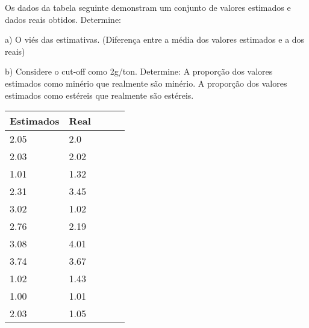 \begin{exercise}

Os dados da tabela seguinte demonstram um conjunto de valores estimados e dados reais obtidos. Determine:

a) O viés das estimativas. (Diferença entre a média dos valores estimados e a dos reais)

b) Considere o cut-off como 2g/ton. Determine: A proporção dos valores estimados como minério que realmente são minério. A proporção dos valores estimados como estéreis que realmente são estéreis. 

	\begin{tabular}{lllll}
		\hline
		Estimados & Real &  &  &  \\ \hline
		2.05      & 2.0  &  &  &  \\
		2.03      & 2.02 &  &  &  \\
		1.01      & 1.32 &  &  &  \\
		2.31      & 3.45 &  &  &  \\
		3.02      & 1.02 &  &  &  \\
		2.76      & 2.19 &  &  &  \\
		3.08      & 4.01 &  &  &  \\
		3.74      & 3.67 &  &  &  \\
		1.02      & 1.43 &  &  &  \\
		1.00      & 1.01 &  &  &  \\
		2.03      & 1.05 &  &  &  \\ \hline
	\end{tabular}
\end{exercise}


